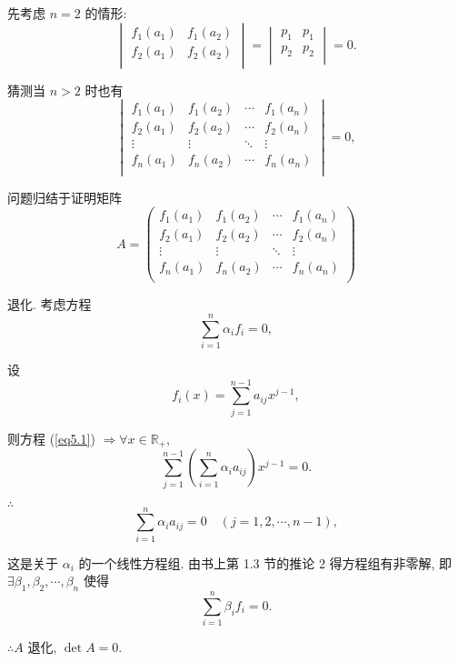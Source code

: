 \documentclass{ctexart}
\begin{document}
\begin{solution}
    先考虑 $n=2$ 的情形:
    \[\begin{vmatrix}
        f_1(a_1) & f_1(a_2) \\
        f_2(a_1) & f_2(a_2) \\
    \end{vmatrix}=\begin{vmatrix}
        p_1 & p_1 \\
        p_2 & p_2 \\
    \end{vmatrix}=0.\]

    猜测当 $n>2$ 时也有
    \[\begin{vmatrix}
        f_1(a_1) & f_1(a_2) & \cdots & f_1(a_n) \\
        f_2(a_1) & f_2(a_2) & \cdots & f_2(a_n) \\
        \vdots & \vdots & \ddots & \vdots \\
        f_n(a_1) & f_n(a_2) & \cdots & f_n(a_n) \\
    \end{vmatrix}=0,\]

    问题归结于证明矩阵
    \[A=\begin{pmatrix}
        f_1(a_1) & f_1(a_2) & \cdots & f_1(a_n) \\
        f_2(a_1) & f_2(a_2) & \cdots & f_2(a_n) \\
        \vdots & \vdots & \ddots & \vdots \\
        f_n(a_1) & f_n(a_2) & \cdots & f_n(a_n) \\
    \end{pmatrix}\]

    退化. 考虑方程
    \begin{equation}\label{eq5.1}
        \sum\limits_{i=1}^n\alpha_if_i=0,
    \end{equation}

    设
    \[f_i(x)=\sum\limits_{j=1}^{n-1}a_{ij}x^{j-1},\]

    则方程 (\ref{eq5.1}) $\Rightarrow\forall x\in\mathbb{R}_+$,
    \[\sum\limits_{j=1}^{n-1}\left(\sum\limits_{i=1}^n\alpha_ia_{ij}\right)x^{j-1}=0.\]

    $\therefore$
    \[\sum\limits_{i=1}^n\alpha_ia_{ij}=0\quad(j=1,2,\cdots,n-1),\]

    这是关于 $\alpha_i$ 的一个线性方程组. 由书上第 1.3 节的推论 2 得方程组有非零解, 即 $\exists\beta_1,\beta_2,\cdots,\beta_n$ 使得
    \[\sum\limits_{i=1}^n\beta_if_i=0.\]

    $\therefore A$ 退化, $\det A=0$.
\end{solution}
\end{document}
